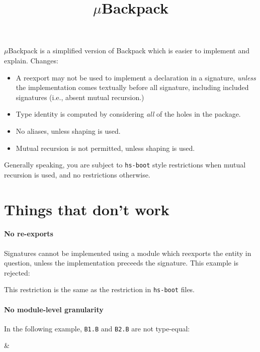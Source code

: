 \documentclass{article}
\title{$\mu$Backpack}
\begin{document}
\maketitle

$\mu$Backpack is a simplified version of
Backpack which is easier to implement and explain. Changes:

\begin{itemize}
    \item A reexport may not be used to implement a declaration in a signature, \emph{unless} the implementation comes textually before all signature, including included signatures (i.e., absent mutual recursion.)
\item Type identity is computed by considering \emph{all} of the holes in the package.
\item No aliases, unless shaping is used.
\item Mutual recursion is not permitted, unless shaping is used.
\end{itemize}

Generally speaking, you are subject to \verb|hs-boot| style restrictions when mutual
recursion is used, and no restrictions otherwise.

\section{Things that don't work}

\paragraph{No re-exports} Signatures cannot be implemented using a module
which reexports the entity in question, unless the implementation preceeds
the signature.  This example is rejected:

\begin{example}
\end{example}

This restriction is the same as the restriction in \verb|hs-boot| files.

\paragraph{No module-level granularity} In the following example, \verb|B1.B| and
\verb|B2.B| are not type-equal:

\begin{example}
 &
\end{example}
\end{document}
